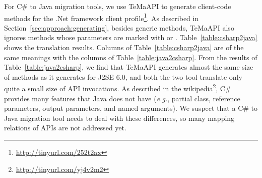 For C\# to Java migration tools, we use TeMaAPI to generate client-code methods for the .Net framework client profile\footnote{\url{http://tinyurl.com/252t2ax}}. As described in Section~\ref{sec:approach:generating}, besides generic methods, TeMaAPI also ignores methods whose parameters are marked with  or . Table~\ref{table:csharp2java} shows the translation results. Columns of Table~\ref{table:csharp2java} are of the same meanings with the columns of Table~\ref{table:java2csharp}. From the results of Table~\ref{table:java2csharp}, we find that TeMaAPI generates almost the same size of methods as it generates for J2SE 6.0, and both the two tool translate only quite a small size of API invocations. As described in the wikipedia\footnote{\url{http://tinyurl.com/yj4v2m2}}, C\# provides many features that Java does not have (\emph{e.g.}, partial class, reference parameters, output parameters, and named arguments). We suspect that a C\# to Java migration tool needs to deal with these differences, so many mapping relations of APIs are not addressed yet.
